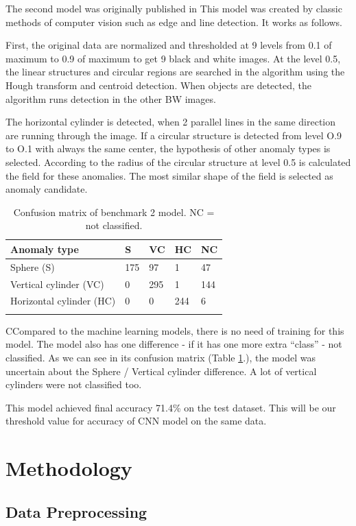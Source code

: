 \documentclass{article}
\begin{document}
The second model was originally published in \cite{lenka}
This model was created by classic methods of computer vision such as
edge and line detection. It works as follows.

First, the original data are normalized and thresholded at 9 levels from 0.1 of maximum to 0.9 of maximum to get 9
black and white images. At the level 0.5, the linear structures and
circular regions are searched in the algorithm using the Hough transform
and centroid detection. When objects are detected, the algorithm runs
detection in the other BW images.

The horizontal cylinder is detected, when 2 parallel lines in the same
direction are running through the image. If a circular structure is
detected from level O.9 to O.1 with always the same center, the
hypothesis of other anomaly types is selected. According to the radius
of the circular structure at level 0.5 is calculated the field for these
anomalies. The most similar shape of the field is selected as anomaly
candidate.

\begin{longtable}[c]{@{}lllll@{}}
\toprule
Anomaly type & S & VC & HC & NC\tabularnewline
\midrule
\endhead
Sphere (S) & 175 & 97 & 1 & 47\tabularnewline
Vertical cylinder (VC) & 0 & 295 & 1 & 144\tabularnewline
Horizontal cylinder (HC) & 0 & 0 & 244 & 6\tabularnewline
\bottomrule
\caption[Confusion matrix of benchmark 2 model]{Confusion matrix of benchmark 2 model. NC = not classified.}
\label{tab:ConfusionMatrixBenchmark2}
\end{longtable}


CCompared to the machine learning models, there is no need of training
for this model. The model also has one difference - if it has one more
extra ``class'' - not classified. As we can see in its confusion
matrix (Table \ref{tab:ConfusionMatrixBenchmark2}.), the model was uncertain about the Sphere / Vertical cylinder
difference. A lot of vertical cylinders were not classified too. 

This model achieved final accuracy 71.4\% on the test dataset. This will be our threshold value for accuracy of CNN model on the same data.



\section{Methodology}\label{methodology}

\subsection{Data Preprocessing}\label{data-preprocessing}
\end{document}
